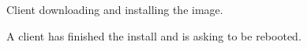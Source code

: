 \begin{figure}[h!]
  \begin{center}
    \centerline{
      }
    \caption{Client downloading and installing the image.}
    \label{fig:sbs-install-rsync}
  \end{center}
\end{figure}

\begin{figure}[!h]
  \begin{center}
    \centerline{
      }
    \caption{A client has finished the install and is asking to be
      rebooted.} 
    \label{fig:sbs-install-finish}
  \end{center}
\end{figure}



\clearpage
